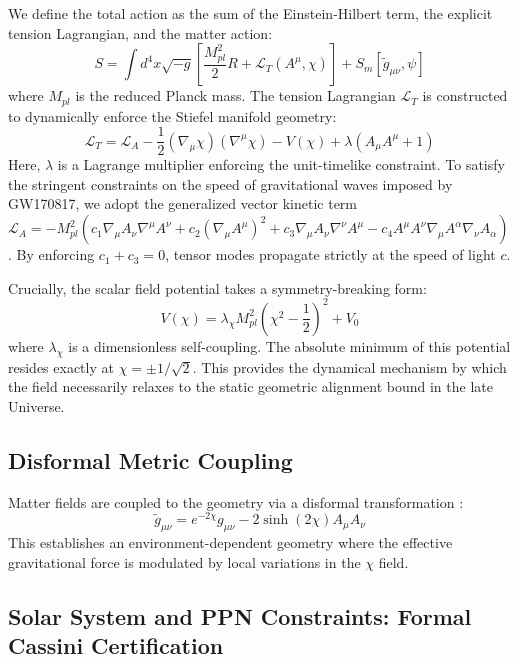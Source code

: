 \documentclass[twocolumn,amsmath,amssymb,floatfix]{article}
\newcommand{\gmunu}{g_{\mu\nu}}
\newcommand{\tmunu}{\tilde{g}_{\mu\nu}}
\begin{document}
We define the total action as the sum of the Einstein-Hilbert term, the explicit tension Lagrangian, and the matter action:
\begin{equation}
    S = \int d^4x \sqrt{-g} \left[ \frac{M_{pl}^2}{2} R + \mathcal{L}_{T}(A^\mu, \chi) \right] + S_{m}[\tmunu, \psi]
\end{equation}
where $M_{pl}$ is the reduced Planck mass. The tension Lagrangian $\mathcal{L}_{T}$ is constructed to dynamically enforce the Stiefel manifold geometry:
\begin{equation}
    \mathcal{L}_{T} = \mathcal{L}_{A} - \frac{1}{2} (\nabla_\mu \chi)(\nabla^\mu \chi) - V(\chi) + \lambda(A_\mu A^\mu + 1)
\end{equation}
Here, $\lambda$ is a Lagrange multiplier enforcing the unit-timelike constraint. To satisfy the stringent constraints on the speed of gravitational waves imposed by GW170817, we adopt the generalized vector kinetic term $\mathcal{L}_A = - M_{pl}^2 ( c_1 \nabla_\mu A_\nu \nabla^\mu A^\nu + c_2 (\nabla_\mu A^\mu)^2 + c_3 \nabla_\mu A_\nu \nabla^\nu A^\mu - c_4 A^\mu A^\nu \nabla_\mu A^\alpha \nabla_\nu A_\alpha )$. By enforcing $c_1 + c_3 = 0$, tensor modes propagate strictly at the speed of light $c$.

Crucially, the scalar field potential takes a symmetry-breaking form:
\begin{equation}
    V(\chi) = \lambda_\chi M_{pl}^2 \left( \chi^2 - \frac{1}{2} \right)^2 + V_0
\end{equation}
where $\lambda_\chi$ is a dimensionless self-coupling. The absolute minimum of this potential resides exactly at $\chi = \pm 1/\sqrt{2}$. This provides the dynamical mechanism by which the field necessarily relaxes to the static geometric alignment bound in the late Universe.

\subsection{Disformal Metric Coupling}

Matter fields are coupled to the geometry via a disformal transformation \citep{Bettoni2013, Zumalacarregui2014}:
\begin{equation}
    \tmunu = e^{-2\chi} \gmunu - 2\sinh(2\chi) A_\mu A_\nu
\end{equation}
This establishes an environment-dependent geometry where the effective gravitational force is modulated by local variations in the $\chi$ field.

\subsection{Solar System and PPN Constraints: Formal Cassini Certification}
\end{document}
